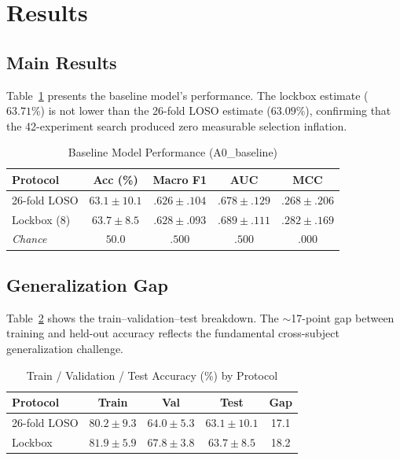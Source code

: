 \documentclass[conference]{IEEEtran}
\begin{document}
\section{Results}

\subsection{Main Results}
Table~\ref{tab:main_results} presents the baseline model's performance. The lockbox estimate ($63.71\%$) is not lower than the 26-fold LOSO estimate ($63.09\%$), confirming that the 42-experiment search produced zero measurable selection inflation.

\begin{table}[t]
\centering
\caption{Baseline Model Performance (A0\_baseline)}
\label{tab:main_results}
\begin{tabular}{lcccc}
\toprule
\textbf{Protocol} & \textbf{Acc (\%)} & \textbf{Macro F1} & \textbf{AUC} & \textbf{MCC} \\
\midrule
26-fold LOSO & $63.1\!\pm\!10.1$ & $.626\!\pm\!.104$ & $.678\!\pm\!.129$ & $.268\!\pm\!.206$ \\
Lockbox (8) & $63.7\!\pm\!8.5$ & $.628\!\pm\!.093$ & $.689\!\pm\!.111$ & $.282\!\pm\!.169$ \\
\midrule
\textit{Chance} & $50.0$ & $.500$ & $.500$ & $.000$ \\
\bottomrule
\end{tabular}
\end{table}

\subsection{Generalization Gap}
Table~\ref{tab:gap} shows the train--validation--test breakdown. The $\sim$17-point gap between training and held-out accuracy reflects the fundamental cross-subject generalization challenge.

\begin{table}[t]
\centering
\caption{Train / Validation / Test Accuracy (\%) by Protocol}
\label{tab:gap}
\begin{tabular}{lcccc}
\toprule
\textbf{Protocol} & \textbf{Train} & \textbf{Val} & \textbf{Test} & \textbf{Gap} \\
\midrule
26-fold LOSO & $80.2\!\pm\!9.3$ & $64.0\!\pm\!5.3$ & $63.1\!\pm\!10.1$ & 17.1 \\
Lockbox & $81.9\!\pm\!5.9$ & $67.8\!\pm\!3.8$ & $63.7\!\pm\!8.5$ & 18.2 \\
\bottomrule
\end{tabular}
\end{table}
\end{document}
